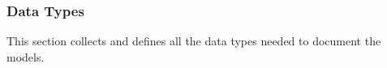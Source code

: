 \documentclass[12pt]{article}
\newcommand*{\defDesc}{\mathbf{I}}
\newcommand*{\posInt}{\mathbb{Z}_{> 0}}
\newcommand{\colAwidth}{0.13\textwidth}
\newcommand{\colBwidth}{0.82\textwidth}
\newcounter{datadefnum} %
\begin{document}

\newpage

\subsubsection{Data Types}\label{sec_datatypes}

This section collects and defines all the data types needed to document the
models.
\end{document}

